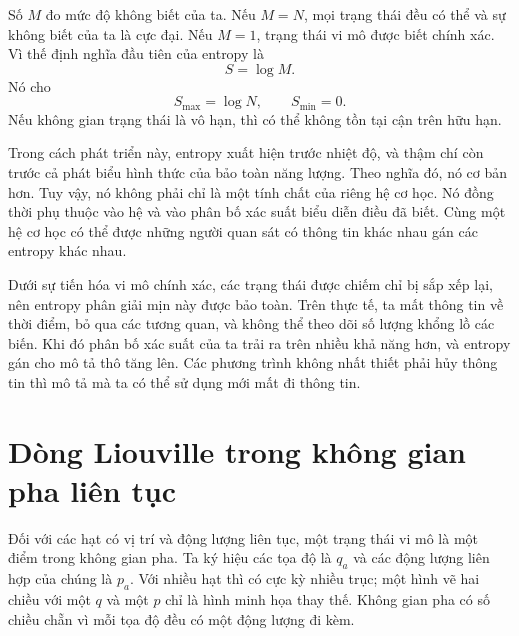 Số \(M\) đo mức độ không biết của ta. Nếu \(M=N\), mọi trạng thái đều có thể và sự không biết của ta là cực đại. Nếu \(M=1\), trạng thái vi mô được biết chính xác. Vì thế định nghĩa đầu tiên của entropy là
\begin{equation}
 S=\log M.
 \label{eq:sm1-entropy-logm}
\end{equation}
Nó cho
\begin{equation}
 S_{\max}=\log N,
 \qquad
 S_{\min}=0.
\end{equation}
Nếu không gian trạng thái là vô hạn, thì có thể không tồn tại cận trên hữu hạn.

Trong cách phát triển này, entropy xuất hiện trước nhiệt độ, và thậm chí còn trước cả phát biểu hình thức của bảo toàn năng lượng. Theo nghĩa đó, nó cơ bản hơn. Tuy vậy, nó không phải chỉ là một tính chất của riêng hệ cơ học. Nó đồng thời phụ thuộc vào hệ và vào phân bố xác suất biểu diễn điều đã biết. Cùng một hệ cơ học có thể được những người quan sát có thông tin khác nhau gán các entropy khác nhau.

Dưới sự tiến hóa vi mô chính xác, các trạng thái được chiếm chỉ bị sắp xếp lại, nên entropy phân giải mịn này được bảo toàn. Trên thực tế, ta mất thông tin về thời điểm, bỏ qua các tương quan, và không thể theo dõi số lượng khổng lồ các biến. Khi đó phân bố xác suất của ta trải ra trên nhiều khả năng hơn, và entropy gán cho mô tả thô tăng lên. Các phương trình không nhất thiết phải hủy thông tin thì mô tả mà ta có thể sử dụng mới mất đi thông tin.

\begin{classroomqa}
\end{classroomqa}

\section{Dòng Liouville trong không gian pha liên tục}

Đối với các hạt có vị trí và động lượng liên tục, một trạng thái vi mô là một điểm trong không gian pha. Ta ký hiệu các tọa độ là \(q_a\) và các động lượng liên hợp của chúng là \(p_a\). Với nhiều hạt thì có cực kỳ nhiều trục; một hình vẽ hai chiều với một \(q\) và một \(p\) chỉ là hình minh họa thay thế. Không gian pha có số chiều chẵn vì mỗi tọa độ đều có một động lượng đi kèm.

